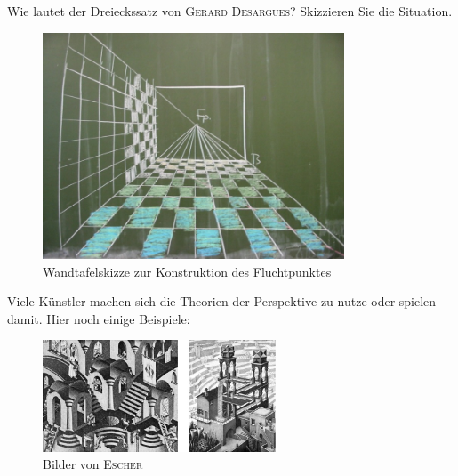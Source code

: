 \documentclass[%
11pt,%
twoside,%
titlepage,%
a4page,%
german,%
headsepline%
]{scrartcl}
\begin{document}
\begin{ueb}
Wie lautet der Dreieckssatz von \textsc{Gerard Desargues}? Skizzieren Sie die Situation.
\end{ueb}

\begin{figure}[h!]
\begin{center}
\includegraphics[width=0.8\textwidth]{pictures/fluchtp}
\caption{Wandtafelskizze zur Konstruktion des Fluchtpunktes}
\end{center}
\end{figure}

Viele K\"unstler machen sich die Theorien der Perspektive zu nutze oder spielen damit. Hier noch einige Beispiele:

\begin{figure}[h!]
\begin{center}
\includegraphics[width=0.618\textwidth]{pictures/escher}
\caption{Bilder von \textsc{Escher}}
\end{center}
\end{figure}
\end{document}
